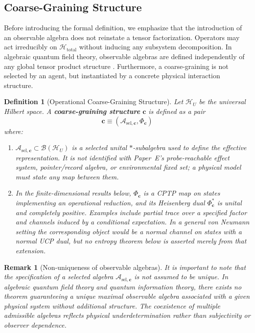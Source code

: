 \documentclass[12pt,a4paper,openany]{book}
\newtheorem{definition}[theorem]{Definition}
\newtheorem{remark}[theorem]{Remark}
\begin{document}
\subsection{Coarse-Graining Structure}

Before introducing the formal definition, we emphasize that the introduction of an observable algebra does not reinstate a tensor factorization. 
Operators may act irreducibly on $\mathcal{H}_{\text{total}}$ without inducing any subsystem decomposition. 
In algebraic quantum field theory, observable algebras are defined independently of any global tensor product structure \cite{Haag1996}.
Furthermore, a coarse-graining is not selected by an agent, but instantiated by a concrete physical interaction structure.

\begin{definition}[Operational Coarse-Graining Structure]
\label{H-A-def:coarse}
Let $\mathcal{H}_U$ be the universal Hilbert space. 
A \textbf{coarse-graining structure} $\mathbf{c}$ is defined as a pair
\[
\boxed{\mathbf{c} \equiv (\mathcal{A}_{\mathrm{sel},\mathbf{c}}, \Phi_{\mathbf{c}})}
\]
where:
\begin{enumerate}
\item $\mathcal{A}_{\mathrm{sel},\mathbf{c}} \subset \mathcal{B}(\mathcal{H}_U)$ is a selected unital $*$-subalgebra used to define the effective representation.  It is not identified with Paper~E's probe-reachable effect system, pointer/record algebra, or environmental fixed set; a physical model must state any map between them.
\item In the finite-dimensional results below, $\Phi_{\mathbf{c}}$ is a CPTP map on states implementing an operational reduction, and its Heisenberg dual $\Phi_{\mathbf c}^*$ is unital and completely positive.  Examples include partial trace over a specified factor and channels induced by a conditional expectation.  In a general von Neumann setting the corresponding object would be a normal channel on states with a normal UCP dual, but no entropy theorem below is asserted merely from that extension.
\end{enumerate}
\end{definition}

\begin{remark}[Non-uniqueness of observable algebras]
It is important to note that the specification of a selected algebra $\mathcal{A}_{\mathrm{sel},\mathbf{c}}$ is not assumed to be unique.
In algebraic quantum field theory and quantum information theory, there exists no theorem guaranteeing a unique maximal observable algebra associated with a given physical system without additional structure. 
The coexistence of multiple admissible algebras reflects physical underdetermination rather than subjectivity or observer dependence.
\end{remark}
\end{document}
